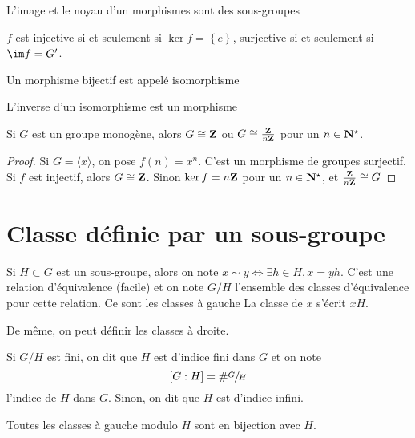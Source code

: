 \begin{prop}
L'image et le noyau d'un morphismes sont des sous-groupes
\end{prop}

\begin{prop}
$f$ est injective  si et seulement si $\ker f= \left\{ e \right\} $, surjective si et seulement si $\im f=G'$.
\end{prop}

\begin{dfn}
    Un morphisme bijectif est appelé isomorphisme
\end{dfn}

\begin{prop}
L'inverse d'un isomorphisme est un morphisme
\end{prop}

\begin{prop}
Si $G$ est un groupe monogène, alors  $G\cong \mathbf Z$ ou $G\cong \frac{\mathbf Z}{n\mathbf Z}$ pour un $n \in  \mathbf N^\star$.
\end{prop}

\begin{proof}
    Si  $G=\langle x\rangle$, on pose  $f(n)=x^n$. C'est un morphisme de groupes surjectif. Si  $f$ est injectif, alors  $G\cong \mathbf Z$. Sinon $\ker f=n\mathbf Z$ pour un $n \in  \mathbf N^\star$, et $\frac{\mathbf Z}{n\mathbf Z}\cong G$
\end{proof}

\section{Classe définie par un sous-groupe}

\begin{defprop}
Si $H\subset G$ est un sous-groupe, alors on note  $x\sim y \iff  \exists h \in  H, x=yh$. C'est une relation d'équivalence (facile) et on note $G/H$ l'ensemble des classes d'équivalence pour cette relation. Ce sont les classes à gauche La classe de $x$ s'écrit  $xH$. 

De même, on peut définir les classes à droite.
\end{defprop}

\begin{dfn}
Si $G / H$ est fini, on dit que  $H$ est d'indice fini dans  $G$ et on note  \[
    [G:H]=\# \sfrac GH
\] 
l'indice de $H$ dans  $G$. Sinon, on dit que  $H$ est d'indice infini.
\end{dfn}

\begin{prop}
Toutes les classes à gauche modulo $H$ sont en bijection avec $H$.
\end{prop}

